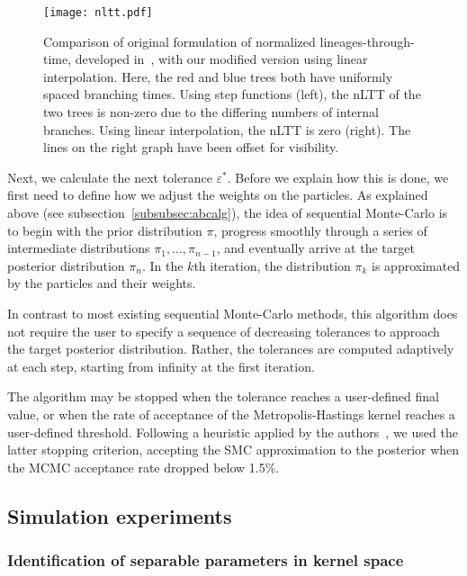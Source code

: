 \begin{figure}[ht]
  \centering
  \caption[Comparison of original and modified normalised lineages-through-time]
    {Comparison of original formulation of normalized lineages-through-time,
     developed in~\autocite{janzen2015approximate}, with our modified version
     using linear interpolation. Here, the red and blue trees both have
     uniformly spaced branching times. Using step functions (left), the nLTT
     of the two trees is non-zero due to the differing numbers of internal
     branches. Using linear interpolation, the nLTT is zero (right). The lines
     on the right graph have been offset for visibility.}
  \texttt{[image: nltt.pdf]}
  \label{fig:nltt}
\end{figure}



Next, we calculate the next tolerance $\varepsilon^*$. Before we explain how
this is done, we first need to define how we adjust the weights on the
particles. As explained above (see subsection~\ref{subsubsec:abcalg}), the idea
of sequential Monte-Carlo is to begin with the prior distribution $\pi$,
progress smoothly through a series of intermediate distributions $\pi_1,
\ldots, \pi_{n-1}$, and eventually arrive at the target posterior distribution
$\pi_n$. In the $k$th iteration, the distribution $\pi_k$ is approximated by
the particles and their weights. 

In contrast to most existing sequential Monte-Carlo methods, this
algorithm does not require the user to specify a sequence of decreasing
tolerances to approach the target posterior distribution. Rather, the
tolerances are computed adaptively at each step, starting from infinity at the
first iteration. 

The algorithm may be stopped when the tolerance reaches a
user-defined final value, or when the rate of acceptance of the
Metropolis-Hastings kernel reaches a user-defined threshold. Following a
heuristic applied by the authors~\autocite{del2012adaptive}, we used the latter
stopping criterion, accepting the SMC approximation to the posterior when the
\gls{MCMC} acceptance rate dropped below 1.5\%.

\subsection{Simulation experiments}

\subsubsection{Identification of separable parameters in kernel space}
\label{subsubsec:kernel}

